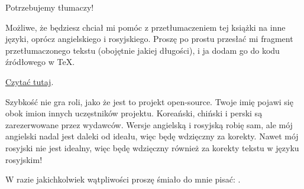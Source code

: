 \vspace*{\fill}

\Huge Potrzebujemy tłumaczy!
\normalsize

\bigskip
\bigskip
\bigskip

Możliwe, że będziesz chciał mi pomóc z przetłumaczeniem tej książki na inne języki, oprócz angielskiego i rosyjskiego.
Proszę po prostu przesłać mi fragment przetłumaczonego tekstu (obojętnie jakiej długości), i ja dodam go do kodu źródłowego w TeX.

\href{https://github.com/dennis714/RE-for-beginners/blob/master/Translation.md}{Czytać tutaj}.

Szybkość nie gra roli, jako że jest to projekt open-source.
Twoje imię pojawi się obok imion innych uczęstników projektu.
Koreański, chiński i perski są zarezerwowane przez wydawców.
Wersje angielską i rosyjską robię sam, ale mój angielski nadal jest daleki od ideału, więc będę wdzięczny za korekty.
Nawet mój rosyjski nie jest idealny, więc będę wdzięczny również za korekty tekstu w języku rosyjskim!

W razie jakichkolwiek wątpliwości proszę śmiało do mnie pisać: \GTT{\EMAIL}.

\vspace*{\fill}
\vfill

